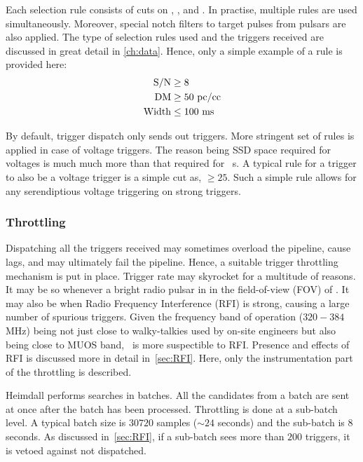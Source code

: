 \par Each selection rule consists of cuts on \sn, \dm, and \wd. In practise, multiple rules are used simultaneously. Moreover, special notch filters to target pulses from pulsars are also applied. 
The type of selection rules used and the triggers received are discussed in great detail in \autoref{ch:data}. Hence, only a simple example of a rule is provided here:
\begin{align*}
	{\rm S/N} &\geq 8 \\
	{\rm DM} &\geq 50 {\rm\ pc/cc} \\
	{\rm Width} &\leq 100 {\rm\ ms}
\end{align*}

\par By default, trigger dispatch only sends out \dbson triggers. More stringent set of rules is applied in case of voltage triggers. 
The reason being SSD space required for voltages is much much more than that required for \dbson~s. 
A typical rule for a \dbson trigger to also be a voltage trigger is a simple cut as, \sn $\geq 25$. Such a simple rule allows for any serendiptious voltage triggering on strong triggers.

\subsubsection {Throttling}
\label{sssub:rfim}
\par Dispatching all the triggers received may sometimes overload the pipeline, cause lags, and may ultimately fail the pipeline.
Hence, a suitable trigger throttling mechanism is put in place.
Trigger rate may skyrocket for a multitude of reasons. It may be so whenever a bright radio pulsar in in the field-of-view (FOV) of \vf.
It may also be when Radio Frequency Interference (RFI) is strong, causing a large number of spurious triggers.
Given the frequency band of operation ($320-384$ MHz) being not just close to walky-talkies used by on-site engineers but also being close to MUOS band, \vf~is more suspectible to RFI.
Presence and effects of RFI is discussed more in detail in~\autoref{sec:RFI}. 
Here, only the instrumentation part of the throttling is described.

\par Heimdall performs searches in batches. All the candidates from a batch are sent at once after the batch has been processed.
Throttling is done at a sub-batch level. A typical batch size is $30720$ samples ($\sim 24$ seconds) and the sub-batch is $8$ seconds.
As discussed in~\autoref{sec:RFI}, if a sub-batch sees more than $200$ triggers, it is vetoed against not dispatched.

